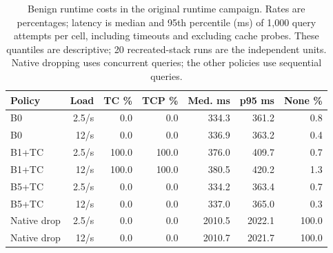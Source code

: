 \begin{table}[t]
\centering
\caption{Benign runtime costs in the original runtime campaign. Rates are percentages; latency is median and 95th percentile (ms) of 1,000 query attempts per cell, including timeouts and excluding cache probes. These quantiles are descriptive; 20 recreated-stack runs are the independent units. Native dropping uses concurrent queries; the other policies use sequential queries.}
\label{tab:benign-cost-original}
\begingroup\fontsize{9}{10.8}\selectfont
\setlength{\tabcolsep}{3pt}
\begin{tabular}{lrrrrrr}
\hline
Policy & Load & TC \% & TCP \% & Med. ms & p95 ms & None \% \\
\hline
B0 & 2.5/s & 0.0 & 0.0 & 334.3 & 361.2 & 0.8 \\
B0 & 12/s & 0.0 & 0.0 & 336.9 & 363.2 & 0.4 \\
B1+TC & 2.5/s & 100.0 & 100.0 & 376.0 & 409.7 & 0.7 \\
B1+TC & 12/s & 100.0 & 100.0 & 380.5 & 420.2 & 1.3 \\
B5+TC & 2.5/s & 0.0 & 0.0 & 334.2 & 363.4 & 0.7 \\
B5+TC & 12/s & 0.0 & 0.0 & 337.0 & 365.0 & 0.3 \\
Native drop & 2.5/s & 0.0 & 0.0 & 2010.5 & 2022.1 & 100.0 \\
Native drop & 12/s & 0.0 & 0.0 & 2010.7 & 2021.7 & 100.0 \\
\hline
\end{tabular}
\endgroup
\end{table}
